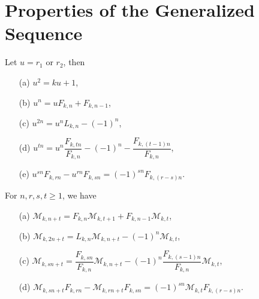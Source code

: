 \section{{Properties of the Generalized \kL\vspace{.5mm} Sequence \M}}
\begin{lemma}
Let $u=r_{1}$ or $r_{2}$, then\label{3.1}
\begin{enumerate}
\item[(a)] $u^2=ku+1$,
\item[(b)] $u^n=uF_{k,n}+F_{k,n-1}$,
\item[(c)] $u^{2n}=u^nL_{k,n}-(-1)^n$,
\item[(d)] $u^{tn}=u^n\dfrac{F_{k,tn}}{F_{k,n}}-(-1)^n-\dfrac{F_{k,(t-1)n}}{F_{k,n}}$,
\item[(e)] $u^{sn}F_{k,rn}-u^{rn}F_{k,sn}=(-1)^{sn}F_{k,(r-s)n}$.
\end{enumerate}
\end{lemma}
\begin{theorem}For $n, r, s, t\geq 1$, we have\label{3.2}
\begin{enumerate}
\item[(a)] $\mathcal{M}_{k,n+t}=F_{k,n}\mathcal{M}_{k,t+1}+F_{k,n-1}\mathcal{M}_{k,t}$,
\item[(b)] $\mathcal{M}_{k,2n+t}=L_{k,n}\mathcal{M}_{k,n+t}-(-1)^n\mathcal{M}_{k,t}$,
\item[(c)] $\mathcal{M}_{k,sn+t}=\dfrac{F_{k,sn}}{F_{k,n}}\mathcal{M}_{k,n+t}-(-1)^n\dfrac{F_{k,(s-1)n}}{F_{k,n}}\mathcal{M}_{k,t}$, 
\item[(d)] $\mathcal{M}_{k,sn+t}F_{k,rn}-\mathcal{M}_{k,rn+t}F_{k,sn}=(-1)^{sn}\mathcal{M}_{k,t}F_{k,(r-s)n}$.
\end{enumerate}
\end{theorem}
